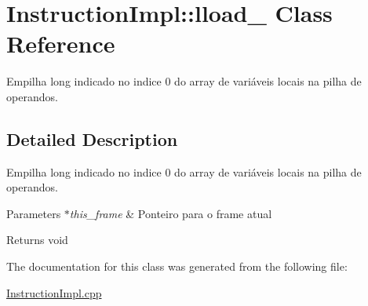 \hypertarget{class_instruction_impl_1_1lload__0}{}\section{Instruction\+Impl\+:\+:lload\+\_ Class Reference}
\label{class_instruction_impl_1_1lload__0}


Empilha long indicado no indice 0 do array de variáveis locais na pilha de operandos.  




\subsection{Detailed Description}
Empilha long indicado no indice 0 do array de variáveis locais na pilha de operandos. 


\begin{DoxyParams}{Parameters}
{\em $\ast$this\+\_\+frame} & Ponteiro para o frame atual \\
\hline
\end{DoxyParams}
\begin{DoxyReturn}{Returns}
void 
\end{DoxyReturn}


The documentation for this class was generated from the following file\+:\begin{DoxyCompactItemize}
\item 
\hyperlink{_instruction_impl_8cpp}{Instruction\+Impl.\+cpp}\end{DoxyCompactItemize}
